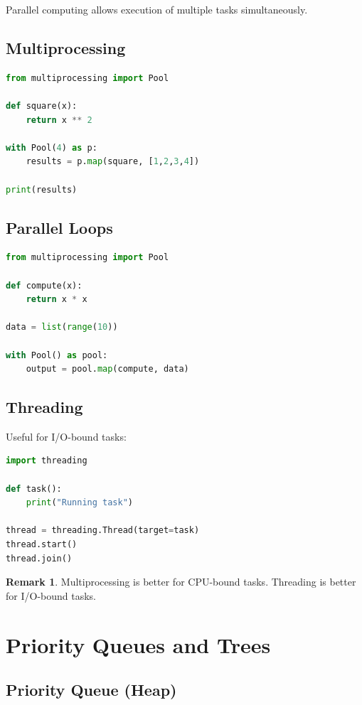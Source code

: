 \documentclass[12pt,oneside]{book}
\numberwithin{equation}{section}
\theoremstyle{definition}
\newtheorem{remark}{Remark}[section]
\theoremstyle{plain}
\theoremstyle{remark}
\begin{document}
Parallel computing allows execution of multiple tasks simultaneously.

\subsection{Multiprocessing}

\begin{lstlisting}[language=Python]
from multiprocessing import Pool

def square(x):
    return x ** 2

with Pool(4) as p:
    results = p.map(square, [1,2,3,4])

print(results)
\end{lstlisting}

\subsection{Parallel Loops}

\begin{lstlisting}[language=Python]
from multiprocessing import Pool

def compute(x):
    return x * x

data = list(range(10))

with Pool() as pool:
    output = pool.map(compute, data)
\end{lstlisting}

\subsection{Threading}

Useful for I/O-bound tasks:

\begin{lstlisting}[language=Python]
import threading

def task():
    print("Running task")

thread = threading.Thread(target=task)
thread.start()
thread.join()
\end{lstlisting}

\begin{remark}
Multiprocessing is better for CPU-bound tasks. Threading is better for I/O-bound tasks.
\end{remark}

\section{Priority Queues and Trees}

\subsection{Priority Queue (Heap)}
\end{document}
